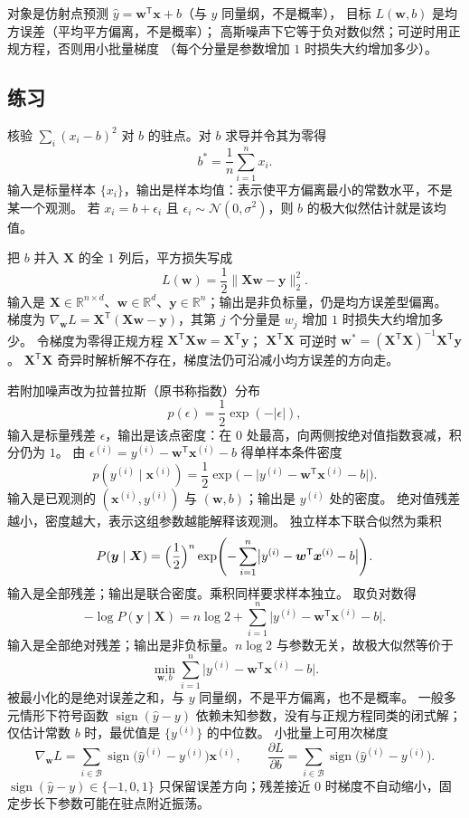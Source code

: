 对象是仿射点预测 $\hat{y}=\bm{w}^{\mathsf T}\bm{x}+b$（与 $y$ 同量纲，不是概率），
目标 $L(\bm{w},b)$ 是均方误差（平均平方偏离，不是概率）；
高斯噪声下它等于负对数似然；可逆时用正规方程，否则用小批量梯度
（每个分量是参数增加 $1$ 时损失大约增加多少）。

\subsection{练习}

核验 $\sum_{i}(x_{i}-b)^{2}$ 对 $b$ 的驻点。对 $b$ 求导并令其为零得
\[
b^{\ast}=\frac{1}{n}\sum_{i=1}^{n}x_{i}.
\]
输入是标量样本 $\{x_i\}$，输出是样本均值：表示使平方偏离最小的常数水平，不是某一个观测。
若 $x_i=b+\epsilon_i$ 且 $\epsilon_i\sim\mathcal{N}(0,\sigma^{2})$，则 $b$ 的极大似然估计就是该均值。

把 $b$ 并入 $\bm{X}$ 的全 $1$ 列后，平方损失写成
\[
L(\bm{w})=\frac{1}{2}\|\bm{X}\bm{w}-\bm{y}\|_{2}^{2}.
\]
输入是 $\bm{X}\in\mathbb{R}^{n\times d}$、$\bm{w}\in\mathbb{R}^{d}$、$\bm{y}\in\mathbb{R}^{n}$；输出是非负标量，仍是均方误差型偏离。
梯度为 $\nabla_{\bm{w}}L=\bm{X}^{\mathsf T}(\bm{X}\bm{w}-\bm{y})$，其第 $j$ 个分量是 $w_j$ 增加 $1$ 时损失大约增加多少。
令梯度为零得正规方程 $\bm{X}^{\mathsf T}\bm{X}\bm{w}=\bm{X}^{\mathsf T}\bm{y}$；
$\bm{X}^{\mathsf T}\bm{X}$ 可逆时 $\bm{w}^{\ast}=(\bm{X}^{\mathsf T}\bm{X})^{-1}\bm{X}^{\mathsf T}\bm{y}$。
$\bm{X}^{\mathsf T}\bm{X}$ 奇异时解析解不存在，梯度法仍可沿减小均方误差的方向走。

若附加噪声改为拉普拉斯（原书称指数）分布
\[
p(\epsilon)=\frac{1}{2}\exp(-|\epsilon|),
\]
输入是标量残差 $\epsilon$，输出是该点密度：在 $0$ 处最高，向两侧按绝对值指数衰减，积分仍为 $1$。
由 $\epsilon^{(i)}=y^{(i)}-\bm{w}^{\mathsf T}\bm{x}^{(i)}-b$ 得单样本条件密度
\[
p(y^{(i)}\mid\bm{x}^{(i)})
=
\frac{1}{2}
\exp\bigl(-\bigl|y^{(i)}-\bm{w}^{\mathsf T}\bm{x}^{(i)}-b\bigr|\bigr).
\]
输入是已观测的 $(\bm{x}^{(i)},y^{(i)})$ 与 $(\bm{w},b)$；输出是 $y^{(i)}$ 处的密度。
绝对值残差越小，密度越大，表示这组参数越能解释该观测。
独立样本下联合似然为乘积
\[
P(\bm{y}\mid\bm{X})
=
\Bigl(\frac{1}{2}\Bigr)^{n}
\exp\Biggl(
-\sum_{i=1}^{n}
\bigl|y^{(i)}-\bm{w}^{\mathsf T}\bm{x}^{(i)}-b\bigr|
\Biggr).
\]
输入是全部残差；输出是联合密度。乘积同样要求样本独立。
取负对数得
\[
-\log P(\bm{y}\mid\bm{X})
=
n\log 2
+
\sum_{i=1}^{n}
\bigl|y^{(i)}-\bm{w}^{\mathsf T}\bm{x}^{(i)}-b\bigr|.
\]
输入是全部绝对残差；输出是非负标量。$n\log 2$ 与参数无关，故极大似然等价于
\[
\min_{\bm{w},b}
\sum_{i=1}^{n}
\bigl|y^{(i)}-\bm{w}^{\mathsf T}\bm{x}^{(i)}-b\bigr|.
\]
被最小化的是绝对误差之和，与 $y$ 同量纲，不是平方偏离，也不是概率。
一般多元情形下符号函数 $\operatorname{sign}(\hat{y}-y)$ 依赖未知参数，没有与正规方程同类的闭式解；
仅估计常数 $b$ 时，最优值是 $\{y^{(i)}\}$ 的中位数。
小批量上可用次梯度
\[
\nabla_{\bm{w}}L
=
\sum_{i\in\mathcal{B}}
\operatorname{sign}\bigl(\hat{y}^{(i)}-y^{(i)}\bigr)\bm{x}^{(i)},
\qquad
\frac{\partial L}{\partial b}
=
\sum_{i\in\mathcal{B}}
\operatorname{sign}\bigl(\hat{y}^{(i)}-y^{(i)}\bigr).
\]
$\operatorname{sign}(\hat{y}-y)\in\{-1,0,1\}$ 只保留误差方向；残差接近 $0$ 时梯度不自动缩小，固定步长下参数可能在驻点附近振荡。

